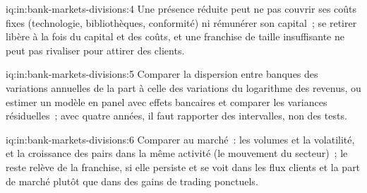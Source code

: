 \begin{solution}{iq:in:bank-markets-divisions:4}
Une présence réduite peut ne pas couvrir ses coûts fixes (technologie, bibliothèques, conformité) ni rémunérer son capital~; se retirer libère
à la fois du capital et des coûts, et une franchise de taille insuffisante ne peut pas rivaliser pour attirer des clients.
\end{solution}

\begin{solution}{iq:in:bank-markets-divisions:5}
Comparer la dispersion entre banques des variations annuelles de la part à celle des variations du logarithme des revenus, ou estimer un
modèle en panel avec effets bancaires et comparer les variances résiduelles~; avec quatre années, il faut rapporter des intervalles, non des tests.
\end{solution}

\begin{solution}{iq:in:bank-markets-divisions:6}
Comparer au marché~: les volumes et la volatilité, et la croissance des pairs dans la même activité (le mouvement du secteur)~; le reste relève
de la franchise, si elle persiste et se voit dans les flux clients et la part de marché plutôt que dans des gains de trading ponctuels.
\end{solution}
